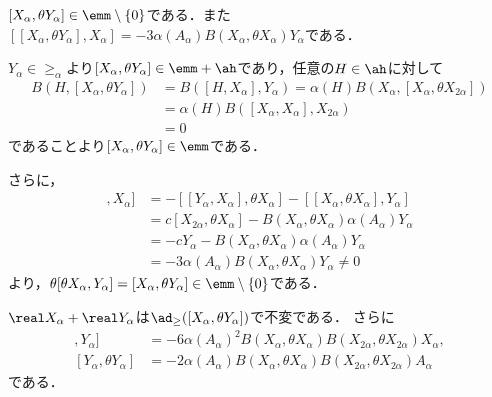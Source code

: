 \begin{lem}\label{lem:3.3}
  $[X_{\alpha},\theta Y_{\alpha}]\in \emm\setminus\{0\} $である．また$[[X_{\alpha}, \theta Y_{\alpha}], X_{\alpha}] = -3\alpha(A_{\alpha})B(X_{\alpha}, \theta X_{\alpha})Y_{\alpha} $である．
\end{lem}

\begin{npfwn}
  $Y_{\alpha} \in \ge_{\alpha} $より$[X_{\alpha},\theta Y_{\alpha}]\in \emm+ \ah$であり，任意の$H\in \ah$に対して
  \begin{align*}
    B(H, [X_{\alpha},\theta Y_{\alpha}]) &= B([H, X_{\alpha}], Y_{\alpha}) = \alpha(H) B(X_{\alpha}, [X_{\alpha}, \theta X_{2\alpha}]) \\
                                         &= \alpha(H)B([X_{\alpha}, X_{\alpha}], X_{2\alpha}) \\
                                         &= 0
  \end{align*}
  であることより$[X_{\alpha},\theta Y_{\alpha}]\in \emm$である．

  さらに，
  \begin{align*}
    [[\theta X_{\alpha},Y_{\alpha}], X_{\alpha}] &= -[[Y_{\alpha}, X_{\alpha}], \theta X_{\alpha}] - [[X_{\alpha}, \theta X_{\alpha}], Y_{\alpha}]\\
                                                 &= c[X_{2\alpha}, \theta X_{\alpha}] -  B(X_{\alpha},\theta X_{\alpha})\alpha(A_{\alpha})Y_{\alpha}\\
                                                 &= -cY_{\alpha}-  B(X_{\alpha},\theta X_{\alpha})\alpha(A_{\alpha})Y_{\alpha} \\
                                                 &= -3\alpha(A_{\alpha})B(X_{\alpha}, \theta X_{\alpha})Y_{\alpha} \neq 0
  \end{align*}
  より，$\theta [\theta X_{\alpha},Y_{\alpha}] = [X_{\alpha},\theta Y_{\alpha}]\in \emm\setminus\{0\} $である．
\end{npfwn}

\vspace{-1em}
\begin{lem}\label{lem:3.4}  
  $\real X_{\alpha} + \real Y_{\alpha} $は$\ad_{\ge}([X_{\alpha}, \theta Y_{\alpha}]) $で不変である．  
  さらに
  \begin{align*}
    [[X_{\alpha}, \theta Y_{\alpha}], Y_{\alpha}] &= -6\alpha(A_{\alpha})^2B(X_{\alpha}, \theta X_{\alpha})B(X_{2\alpha}, \theta X_{2\alpha})X_{\alpha},\\
  [Y_{\alpha}, \theta Y_{\alpha}] &= -2\alpha(A_{\alpha})B(X_{\alpha}, \theta X_{\alpha})B(X_{2\alpha}, \theta X_{2\alpha})A_{\alpha}
  \end{align*}
  である．

\end{lem}

